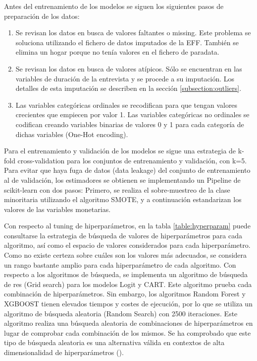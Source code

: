 Antes del entrenamiento de los modelos se siguen los siguientes pasos de preparación de los datos:
\begin{enumerate}
    \item Se revisan los datos en busca de valores faltantes o missing. Este problema se soluciona utilizando el fichero de datos imputados de la EFF. También se elimina un hogar porque no tenía valores en el fichero de paradata.
    \item Se revisan los datos en busca de valores atípicos. Sólo se encuentran en las variables de duración de la entrevista y se procede a su imputación. Los detalles de esta imputación se describen en la sección \ref{subsection:outliers}.
    \item Las variables categóricas ordinales se recodifican para que tengan valores crecientes que empiecen por valor 1. Las variables categóricas no ordinales se codifican creando variables binarias de valores 0 y 1 para cada categoría de dichas variables (One-Hot encoding).
\end{enumerate}

Para el entrenamiento y validación de los modelos se sigue una estrategia de k-fold cross-validation para los conjuntos de entrenamiento y validación, con k=5. Para evitar que haya fuga de datos (data leakage) del conjunto de entrenamiento al de validación, los estimadores se obtienen se implementando un Pipeline de scikit-learn con dos pasos: Primero, se realiza el sobre-muestreo de la clase minoritaria utilizando el algoritmo SMOTE, y a continuación estandarizan los valores de las variables monetarias.

Con respecto al tuning de hiperparámetros, en la tabla \ref{table:hyperparam} puede consultarse la estrategia de búsqueda de valores de hiperparámetros para cada algoritmo, así como el espacio de valores considerados para cada hiperparámetro. Como no existe certeza sobre cuáles son los valores más adecuados, se considera un rango bastante amplio para cada hiperparámetro de cada algoritmo. Con respecto a los algoritmos de búsqueda, se implementa un algoritmo de búsqueda de res (Grid search) para los modelos Logit y CART. Este algoritmo prueba cada combinación de hiperparámetros. Sin embargo, los algoritmos Random Forest y XGBOOST tienen elevados tiempos y costes de ejecución, por lo que se utiliza un algoritmo de búsqueda aleatoria (Random Search) con 2500 iteraciones. Este algoritmo realiza una búsqueda aleatoria de combinaciones de hiperparámetros en lugar de comprobar cada combinación de los mismos. Se ha comprobado que este tipo de búsqueda aleatoria es una alternativa válida en contextos de alta dimensionalidad de hiperparámetros (\cite{bergstra2012random}).

